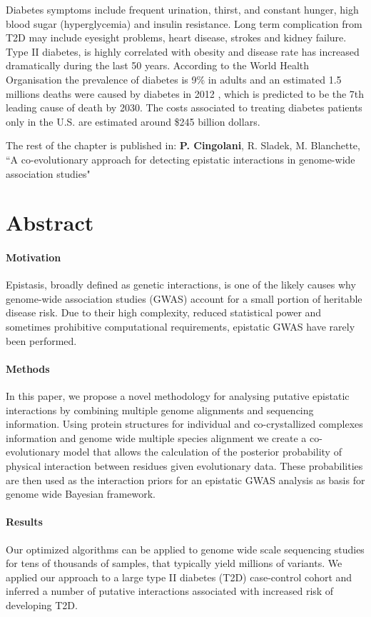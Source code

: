 Diabetes symptoms include frequent urination, thirst, and constant hunger, high blood sugar (hyperglycemia) and insulin resistance. Long term complication from T2D may include eyesight problems, heart disease, strokes and kidney failure. Type II diabetes, is highly correlated with obesity and disease rate has increased dramatically during the last 50 years. According to the World Health Organisation the prevalence of diabetes is 9\% in adults and an estimated 1.5 millions deaths were caused by diabetes in 2012 \cite{guariguata2014global}, which is predicted to be the 7th leading cause of death by 2030. The costs associated to treating diabetes patients only in the U.S. are estimated around \$245 billion dollars.

The rest of the chapter is published in: \textbf{P. Cingolani}, R. Sladek, M. Blanchette, ``A co-evolutionary approach for detecting epistatic interactions in genome-wide association studies"

\section{Abstract}

\paragraph{Motivation} Epistasis, broadly defined as genetic interactions, is one of the likely causes why genome-wide association studies (GWAS) account for a small portion of heritable disease risk. Due to their high complexity, reduced statistical power and sometimes prohibitive computational requirements, epistatic GWAS have rarely been performed. 

\paragraph{Methods} In this paper, we propose a novel methodology for analysing putative epistatic interactions by combining multiple genome alignments and sequencing information. Using protein structures for individual and co-crystallized complexes information and genome wide multiple species alignment we create a co-evolutionary model that allows the calculation of the posterior probability of physical interaction between residues given evolutionary data. These probabilities are then used as the interaction priors for an epistatic GWAS analysis as basis for genome wide Bayesian framework. 

\paragraph{Results} Our optimized algorithms can be applied to genome wide scale sequencing studies for tens of thousands of samples, that typically yield millions of variants. We applied our approach to a large type II diabetes (T2D) case-control cohort and inferred a number of putative interactions associated with increased risk of developing T2D. 

